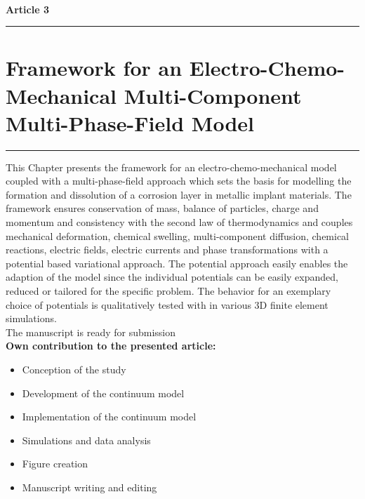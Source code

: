 \ \vspace{1cm} \\
{\Large \bf Article 3}
\normalsize
\vspace{0.3cm}
\hrule
\section*{\Large \centering Framework for an Electro-Chemo-Mechanical Multi-Component Multi-Phase-Field Model}
\hrule
\vspace{1.5cm}

This Chapter presents the framework for an electro-chemo-mechanical model coupled with a multi-phase-field approach which sets the basis for modelling the formation and dissolution of a corrosion layer in metallic implant materials. The framework ensures conservation of mass, balance of particles, charge and momentum and consistency with the second law of thermodynamics and couples mechanical deformation, chemical swelling, multi-component diffusion, chemical reactions, electric fields, electric currents and phase transformations with a potential based variational approach. The potential approach easily enables the adaption of the model since the individual potentials can be easily expanded, reduced or tailored for the specific problem. The behavior for an exemplary choice of potentials is qualitatively tested with in various 3D finite element simulations.  \\

The manuscript is ready for submission \\

\textbf{Own contribution to the presented article:}
\begin{itemize}
\item Conception of the study
\item Development of the continuum model
\item Implementation of the continuum model
\item Simulations and data analysis
\item Figure creation 
\item Manuscript writing and editing
\end{itemize}